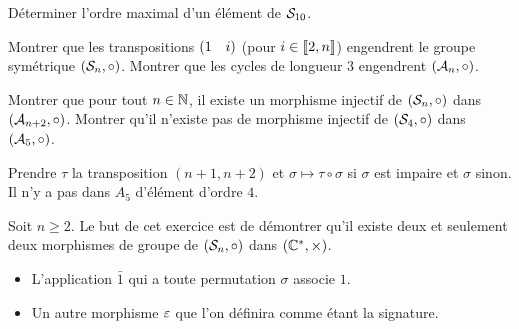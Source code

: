 \documentclass{magnolia}
\begin{document}
Déterminer l'ordre maximal d'un élément de $\mathcal{S}_{10}$.



\begin{questions}
\question Montrer que les transpositions $\left(1\quad i\right)$ (pour
  $i\in\left\llbracket 2,n\right\rrbracket$) engendrent le groupe symétrique $(\mathcal{S}_{n}, \circ)$.
\question Montrer que les cycles de longueur $3$ engendrent $(\mathcal{A}_{n},\circ)$.
\end{questions}

\begin{questions}
\question Montrer que pour tout $n\in\mathbb{N}$, il existe un morphisme injectif de
  $(\mathcal{S}_{n},\circ)$ dans $(\mathcal{A}_{n+2},\circ)$.
\question Montrer qu'il n'existe pas de morphisme injectif de $(\mathcal{S}_{4},\circ)$
  dans $(\mathcal{A}_{5},\circ)$.
\end{questions}
\begin{sol}
Prendre $\tau$ la transposition $(n+1,n+2)$ et $\sigma \mapsto
\tau \circ \sigma$ si $\sigma$ est impaire et $\sigma$ sinon.\\
Il n'y a pas dans $A_5$ d'élément d'ordre $4$.
\end{sol}

Soit $n\geq2$. Le but de cet exercice est de démontrer qu'il existe deux
et seulement deux morphismes de groupe de $(\mathcal{S}_{n},\circ)$ dans
$(\mathbb{C}^*,\times)$.
\begin{itemize}
\item L'application $\bar{1}$ qui a toute permutation $\sigma$ associe $1$.
\item Un autre morphisme $\signature$ que l'on définira comme étant la
  signature.
\end{itemize}
\end{document}
